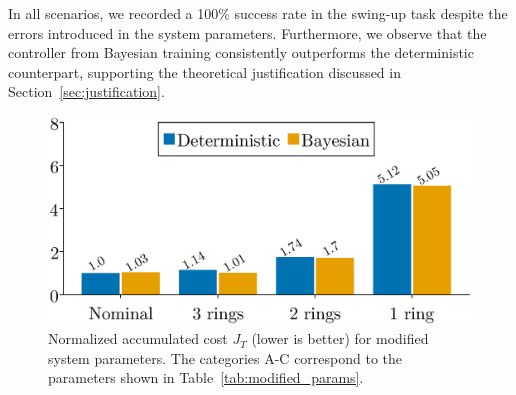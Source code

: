 \begin{enumerate}
    In all scenarios, we recorded a 100\% success rate in the swing-up task despite
    the errors introduced in the system parameters.
    Furthermore, we observe that the controller from Bayesian training consistently
    outperforms the deterministic counterpart, supporting the
    theoretical justification discussed in Section~\ref{sec:justification}. 
    \begin{figure}[H]
        \centering
        \includegraphics[width=0.6\linewidth]{./figures/idapbc_bar.eps}
        \caption{
            Normalized accumulated cost $J_{T}$ (lower is better) for
            modified system parameters.
            The categories A-C correspond to the parameters shown in
            Table~\ref{tab:modified_params}.
        }
        \label{fig:neuralidapbc_bar_plot}
    \end{figure}
\end{enumerate}
%
